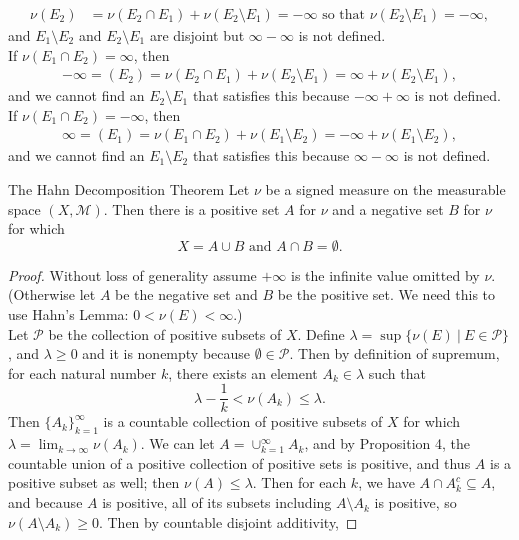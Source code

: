 \begin{flushleft}
\begin{align*}
			\nu(E_2)&=\nu(E_2\cap E_1)+\nu(E_2\setminus E_1)=-\infty\text{ so that }\nu(E_2\setminus E_1)=-\infty,
		\end{align*}
		and $E_1\setminus E_2$ and $E_2\setminus E_1$ are disjoint but $\infty-\infty$ is not defined.
		\\If $\nu(E_1\cap E_2)=\infty$, then 
		\begin{align*}
			-\infty=(E_2)=\nu(E_2\cap E_1)+\nu(E_2\setminus E_1)=\infty+\nu(E_2\setminus E_1),
		\end{align*}
		and we cannot find an $E_2\setminus E_1$ that satisfies this because $-\infty+\infty$ is not defined.
		\\If $\nu(E_1\cap E_2)=-\infty$, then 
		\begin{align*}
			\infty=(E_1)=\nu(E_1\cap E_2)+\nu(E_1\setminus E_2)=-\infty+\nu(E_1\setminus E_2),
		\end{align*}
		and we cannot find an $E_1\setminus E_2$ that satisfies this because $\infty-\infty$ is not defined.
	\begin{namedthm*}{The Hahn Decomposition Theorem}
		Let $\nu$ be a signed measure on the measurable space $(X,\mathcal{M})$.
		Then there is a positive set $A$ for $\nu$ and a negative set $B$ for $\nu$ for which
		\[
			X=A\cup B\text{ and }A\cap B=\emptyset.	
		\]
	\end{namedthm*}
	\begin{proof}
		Without loss of generality assume $+\infty$ is the infinite value omitted by $\nu$.
		(Otherwise let $A$ be the negative set and $B$ be the positive set. We need this to use Hahn's Lemma: $0<\nu(E)<\infty$.)
		\\Let $\mathcal{P}$ be the collection of positive subsets of $X$.
		Define $\lambda=\sup\{\nu(E)\ |\ E\in\mathcal{P}\}$, and $\lambda\ge0$ and it is nonempty because $\emptyset\in\mathcal{P}$.
		Then by definition of supremum, for each natural number $k$, there exists an element $A_k\in\lambda$ such that
		\[
			\lambda-\frac{1}{k}<\nu(A_k)\le\lambda.
		\]
		Then $\{A_k\}_{k=1}^\infty$ is a countable collection of positive subsets of $X$ for which $\lambda=\lim_{k\to\infty}\nu(A_k)$.
		We can let $A=\cup_{k=1}^\infty A_k$, and by Proposition 4, the countable union of a positive collection of positive sets is positive, and thus $A$ is a positive subset as well; then $\nu(A)\le\lambda$.
		Then for each $k$, we have $A\cap A_k^c\subseteq A$, and because $A$ is positive, all of its subsets including $A\setminus A_k$ is positive, so $\nu(A\setminus A_k)\ge0$.
		Then by countable disjoint additivity,

\end{proof}
\end{flushleft}
